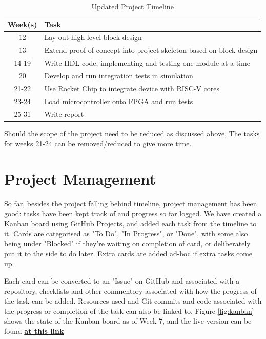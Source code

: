 \documentclass[a4paper,fleqn,12pt]{article}
\begin{document}
\begin{table}[ht!]
	\centering
	\begin{tabular}{|c|l|}
		\hline
		\textbf{Week(s)} & \textbf{Task}                                                       \\ \hline
		12               & Lay out high-level block design                                     \\ \hline
		13               & Extend proof of concept into project skeleton based on block design \\ \hline
		14-19            & Write HDL code, implementing and testing one module at a time       \\ \hline
		20               & Develop and run integration tests in simulation                     \\ \hline
		21-22            & Use Rocket Chip to integrate device with RISC-V cores               \\ \hline
		23-24            & Load microcontroller onto FPGA and run tests                        \\ \hline
		25-31            & Write report                                                        \\ \hline
	\end{tabular}
	\caption{Updated Project Timeline}
	\label{tab:timeline2}
\end{table}

Should the scope of the project need to be reduced as discussed above, The tasks for weeks 21-24 can be removed/reduced to give more time.

\section{Project Management}

So far, besides the project falling behind timeline, project management has been good: tasks have been kept track of and progress so far logged. We have created a Kanban board using GitHub Projects, and added each task from the timeline to it. Cards are categorised as "To Do", "In Progress", or "Done", with some also being under "Blocked" if they're waiting on completion of card, or deliberately put it to the side to do later. Extra cards are added ad-hoc if extra tasks come up.

Each card can be converted to an "Issue" on GitHub and associated with a repository, checklists and other commentory associated with how the progress of the task can be added. Resources used and Git commits and code associated with the progress or completion of the task can also be linked to. Figure \ref{fig:kanban} shows the state of the Kanban board as of Week 7, and the live version can be found \href{https://github.com/users/Joeyh021/projects/2}{\textbf{at this link}}
\end{document}
